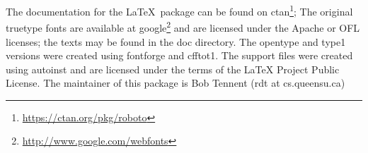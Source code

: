 The documentation for the \LaTeX\ package can be found on ctan\footnote{\url{https://ctan.org/pkg/roboto}}; 
The original truetype fonts are available at google\footnote{\url{http://www.google.com/webfonts}}
and are licensed under the
Apache or OFL licenses; the texts may be found in the
doc directory. The opentype and type1 versions were created
using fontforge and cfftot1. The support files were created
using autoinst and are licensed under the terms of the LaTeX
Project Public License. The maintainer of this package is
Bob Tennent (rdt at cs.queensu.ca)
